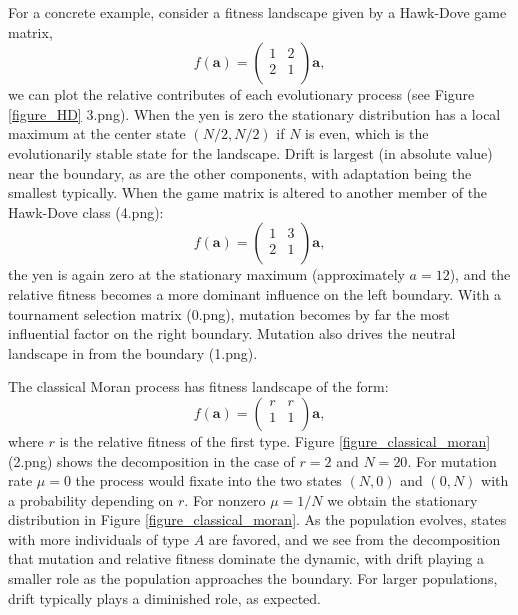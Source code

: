 \documentclass[aps,prd,11pt,notitlepage,nofootinbib,superscriptaddress,showkeys,letterpaper]{revtex4-1}
\begin{document}
For a concrete example, consider a fitness landscape given by a Hawk-Dove game matrix,
\[ f(\mathbf{a}) = \left(\begin{matrix}
              1 & 2\\
              2 & 1\\
             \end{matrix}\right) \mathbf{a},
\]
we can plot the relative contributes of each evolutionary process (see Figure \ref{figure_HD} 3.png). When the yen is zero the stationary distribution has a local maximum at the center state $(N / 2, N / 2)$ if $N$ is even, which is the evolutionarily stable state for the landscape. Drift is largest (in absolute value) near the boundary, as are the other components, with adaptation being the smallest typically. When the game matrix is altered to another member of the Hawk-Dove class (4.png):
\[ f(\mathbf{a}) = \left(\begin{matrix}
              1 & 3\\
              2 & 1\\
             \end{matrix}\right) \mathbf{a},
\]
the yen is again zero at the stationary maximum (approximately $a=12$), and the relative fitness becomes a more dominant influence on the left boundary. With a tournament selection matrix (0.png), mutation becomes by far the most influential factor on the right boundary. Mutation also drives the neutral landscape in from the boundary (1.png).

The classical Moran process has fitness landscape of the form:
\[ f(\mathbf{a}) = \left(\begin{matrix}
              r & r\\
              1 & 1\\
             \end{matrix}\right) \mathbf{a},
\]
where $r$ is the relative fitness of the first type. Figure \ref{figure_classical_moran} (2.png)
shows the decomposition in the case of $r=2$ and $N=20$. For mutation rate $\mu = 0$
the process would fixate into the two states $(N, 0)$ and $(0, N)$ with a probability
depending on $r$. For nonzero $\mu = 1 / N$ we obtain the stationary distribution
in Figure \ref{figure_classical_moran}. As the population evolves, states with more
individuals of type $A$ are favored, and we see from the decomposition that mutation
and relative fitness dominate the dynamic, with drift playing a smaller role as the
population approaches the boundary. For larger populations, drift typically plays a
diminished role, as expected.
\end{document}
